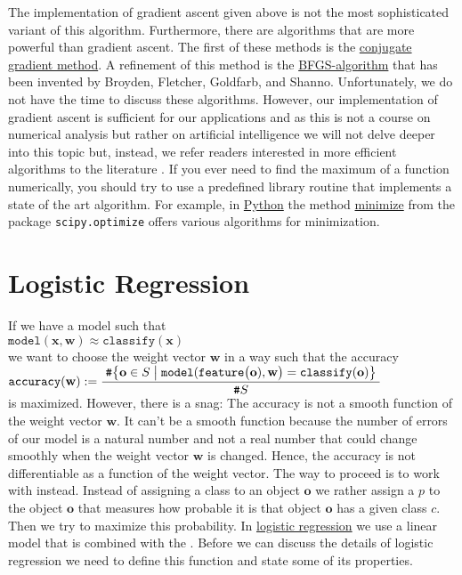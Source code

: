 The implementation of gradient ascent given above is not the most sophisticated variant of this algorithm.
Furthermore, there are algorithms that are more powerful than gradient ascent.  The first of these methods is the
\href{https://en.wikipedia.org/wiki/Conjugate_gradient_method}{conjugate gradient method}.  A
refinement of this method is the
\href{https://en.wikipedia.org/wiki/Broyden-Fletcher-Goldfarb-Shanno_algorithm}{BFGS-algorithm} that
has been invented by Broyden, Fletcher, Goldfarb, and Shanno.  Unfortunately, we do not have the
time to discuss these algorithms.
However, our implementation of gradient ascent is sufficient for our applications and as this is not a course on numerical
analysis but rather on artificial intelligence we will not delve deeper into this topic but, instead, we refer
readers interested in more efficient algorithms to the literature \cite{snyman:2005}.  If you ever need to find
the maximum of a function numerically, you should try to use a predefined library routine that implements a
state of the art algorithm.  For example, in \href{https://www.python.org}{Python} the method
\href{https://docs.scipy.org/doc/scipy/reference/generated/scipy.optimize.minimize.html#scipy.optimize.minimize}{minimize}
from the package \texttt{scipy.optimize} offers various algorithms for minimization.

\section{Logistic Regression}
If we have a model such that 
\\[0.2cm]
\hspace*{1.3cm}
$\mathtt{model}(\mathbf{x}, \mathbf{w}) \approx \mathtt{classify}(\mathbf{x})$
\\[0.2cm]
we want to choose the weight vector $\mathbf{w}$ in a way such that the accuracy 
\\[0.2cm]
\hspace*{1.3cm}
$\displaystyle \mathtt{accuracy}(\mathbf{w}) := 
\frac{\;\texttt{\#} \bigl\{ \mathbf{o} \in S \bigm| \mathtt{model}(\mathtt{feature}\bigl(\mathbf{o}),\mathbf{w}\bigr) = \mathtt{classify}(\mathbf{o})\bigr\}\;}{\texttt{\#} S}$
\\[0.2cm]
is maximized.  However, there is a snag:  The accuracy is not a smooth function of the weight vector
$\mathbf{w}$.  It can't be a smooth function because the number of errors of our model is a natural number and not a real number
that could change smoothly when the weight vector $\mathbf{w}$ is changed.  Hence, the accuracy is not differentiable as a function
of the weight vector.  The way to proceed is to work with  instead.  Instead of assigning a
class to an object $\mathbf{o}$ we rather assign a  $p$ to the object $\mathbf{o}$ that measures how
probable it is that object $\mathbf{o}$ has a given class $c$.  Then we try to maximize this probability.  In
\href{https://en.wikipedia.org/wiki/Logistic_regression}{logistic regression} we use a linear model that is 
combined with the .  Before we can discuss the details of logistic regression we need to
define this function and state some of its properties.  

